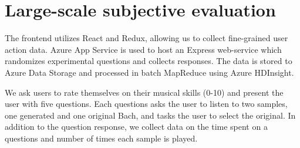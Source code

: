 \documentclass[dissertation.tex]{subfiles}
\begin{document}
\chapter{Large-scale subjective evaluation}

The frontend utilizes React and Redux, allowing us to collect fine-grained user
action data. Azure App Service is used to host an Express web-service which
randomizes experimental questions and collects responses. The data is stored to
Azure Data Storage and processed in batch MapReduce using Azure HDInsight.

We ask users to rate themselves on their musical skills (0-10) and present the
user with five questions. Each questions asks the user to listen to two
samples, one generated and one original Bach, and tasks the user to select the
original. In addition to the question response, we collect data on the time
spent on a questions and number of times each sample is played.

\printbibliography
\end{document}
